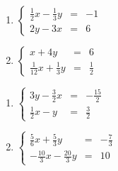 \begin{multicols}{2}
\begin{enumerate}
\setcounter{enumi}{\value{HW}}

\item  $\left\{ \begin{array}{rcr} \frac{1}{2}x-\frac{1}{3}y & = & -1  \\ [5pt] 2y-3x & = & 6 \end{array} \right.$  


\item $\left\{ \begin{array}{rcr} x+4y & = & 6  \\ [5pt] \frac{1}{12}x+\frac{1}{3}y& = & \frac{1}{2}  \end{array} \right.$ 

\setcounter{HW}{\value{enumi}}
\end{enumerate}
\end{multicols}



\begin{multicols}{2}
\begin{enumerate}
\setcounter{enumi}{\value{HW}}

\item  $\left\{ \begin{array}{rcr} 3y-\frac{3}{2}x & = & -\frac{15}{2}  \\ [5pt] \frac{1}{2}x-y & = & \frac{3}{2} \end{array} \right.$   


\item $\left\{ \begin{array}{rcr} \frac{5}{6}x+\frac{5}{3}y & = & -\frac{7}{3}  \\ [5pt] -\frac{10}{3}x-\frac{20}{3}y & = & 10  \end{array} \right.$ \label{reviewsystemlast} 


\setcounter{HW}{\value{enumi}}
\end{enumerate}
\end{multicols}


